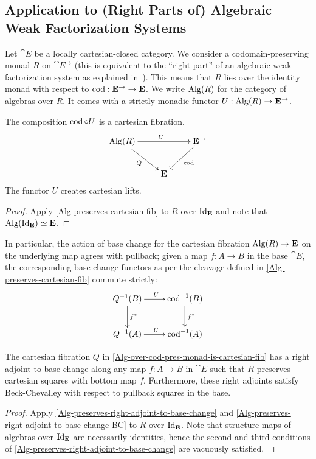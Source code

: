 \documentclass[reqno,10pt,a4paper,oneside]{amsart}
\begin{document}
\subsection{Application to (Right Parts of) Algebraic Weak Factorization Systems}

Let $\cat{E}$ be a locally cartesian-closed category.
We consider a codomain-preserving monad $R$ on $\cat{E}^{\to}$ (this is equivalent to the ``right part'' of an algebraic weak factorization system as explained in~\cite{garner:small-object-argument}).
This means that $R$ lies over the identity monad with respect to $\operatorname{cod} : \mathbf{E}^{\to} \to \mathbf{E}$.
We write $\operatorname{Alg}(R)$ for the category of algebras over $R$.
It comes with a strictly monadic functor $U : \operatorname{Alg}(R) \to \mathbf{E}^{\to}$.

\begin{corollary}
\label{Alg-over-cod-pres-monad-is-cartesian-fib}
The composition $\operatorname{cod} \mathbin{\circ} U$ is a cartesian fibration.
\[
\xymatrix{
  \Alg(R)
  \ar[rr]^{U}
  \ar[dr]_{Q}
&&
  \cat{E}^{\to}
  \ar[dl]^{\cod}
\\&
  \cat{E}
}
\]
The functor $U$ creates cartesian lifts.
\end{corollary}

\begin{proof}
Apply \cref{Alg-preserves-cartesian-fib} to $R$ over $\operatorname{Id}_{\mathbf{E}}$ and note that $\operatorname{Alg}(\operatorname{Id}_{\mathbf{E}}) \simeq \mathbf{E}$.
\end{proof}

In particular, the action of base change for the cartesian fibration $\operatorname{Alg}(R) \to \mathbf{E}$ on the underlying map agrees with pullback; given a map $f : A \to B$ in the base $\cat{E}$, the corresponding base change functors as per the cleavage defined in \cref{Alg-preserves-cartesian-fib} commute strictly:
\[
\xymatrix{
  Q^{-1}(B)
  \ar[r]^{U}
  \ar[d]^{f^*}
&
  \cod^{-1}(B)
  \ar[d]^{f^*}
\\
  Q^{-1}(A)
  \ar[r]^{U}
&
  \cod^{-1}(A)
}
\]

\begin{corollary}
The cartesian fibration $Q$ in \cref{Alg-over-cod-pres-monad-is-cartesian-fib} has a right adjoint to base change along any map $f : A \to B$ in $\cat{E}$ such that $R$ preserves cartesian squares with bottom map $f$.
Furthermore, these right adjoints satisfy Beck-Chevalley with respect to pullback squares in the base.
\end{corollary}

\begin{proof}
Apply \cref{Alg-preserves-right-adjoint-to-base-change} and \cref{Alg-preserves-right-adjoint-to-base-change-BC} to $R$ over $\operatorname{Id}_{\mathbf{E}}$.
Note that structure maps of algebras over $\operatorname{Id}_{\mathbf{E}}$ are necessarily identities, hence the second and third conditions of \cref{Alg-preserves-right-adjoint-to-base-change} are vacuously satisfied.
\end{proof}
\end{document}
